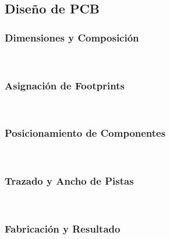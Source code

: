 \subsection{Diseño de PCB}

\subsubsection{Dimensiones y Composición}

\lipsum[2]\\

\subsubsection{Asignación de Footprints}

\lipsum[3]\\

\subsubsection{Posicionamiento de Componentes}

\lipsum[4]\\

\subsubsection{Trazado y Ancho de Pistas}

\lipsum[5]\\

\subsubsection{Fabricación y Resultado}

\lipsum[6]\\